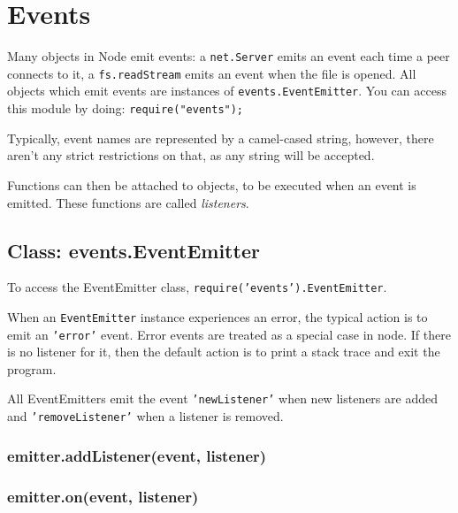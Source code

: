 \section{Events}

\begin{Shaded}
\begin{Highlighting}[]
\NormalTok{: } 
\end{Highlighting}
\end{Shaded}

Many objects in Node emit events: a \texttt{net.Server} emits an event
each time a peer connects to it, a \texttt{fs.readStream} emits an event
when the file is opened. All objects which emit events are instances of
\texttt{events.EventEmitter}. You can access this module by doing:
\texttt{require("events");}

Typically, event names are represented by a camel-cased string, however,
there aren't any strict restrictions on that, as any string will be
accepted.

Functions can then be attached to objects, to be executed when an event
is emitted. These functions are called \emph{listeners}.

\subsection{Class: events.EventEmitter}

To access the EventEmitter class,
\texttt{require('events').EventEmitter}.

When an \texttt{EventEmitter} instance experiences an error, the typical
action is to emit an \texttt{'error'} event. Error events are treated as
a special case in node. If there is no listener for it, then the default
action is to print a stack trace and exit the program.

All EventEmitters emit the event \texttt{'newListener'} when new
listeners are added and \texttt{'removeListener'} when a listener is
removed.

\subsubsection{emitter.addListener(event, listener)}

\subsubsection{emitter.on(event, listener)}

